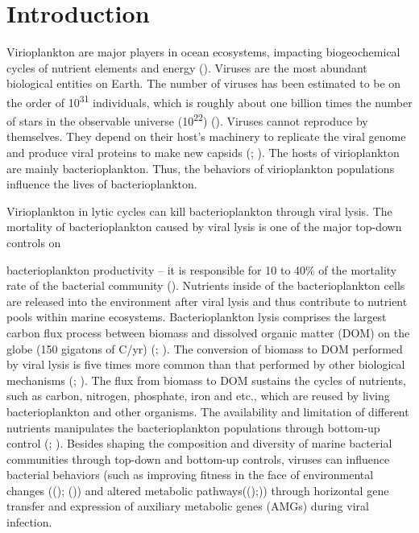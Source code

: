 \documentclass[a4,center,fleqn]{NAR}
\begin{document}
\section{Introduction}

Virioplankton are major players in ocean ecosystems, impacting biogeochemical cycles of nutrient elements and energy (\cite{Suttle2005}). 
Viruses are the most abundant biological entities on Earth. 
The number of viruses has been estimated to be on the order of 10\textsuperscript{31} individuals, which is roughly about one billion times the number of stars in the observable universe (10\textsuperscript{22}) (\cite{Hatfull2006}). 
Viruses cannot reproduce by themselves. They depend on their host’s machinery to replicate the viral genome and produce viral proteins to make new capsids (\cite{Whittaker1998}; \cite{Doms1993}). 
The hosts of virioplankton are mainly bacterioplankton. Thus, the behaviors of virioplankton populations influence the lives of bacterioplankton. 

Virioplankton in lytic cycles can kill bacterioplankton through viral lysis. 
The mortality of bacterioplankton caused by viral lysis is one of the major top-down controls on 

\enlargethispage{-65.1pt}
bacterioplankton productivity – it is responsible for 10 to 40\% of the mortality rate of the bacterial community (\cite{Fuhrman1999}). 
Nutrients inside of the bacterioplankton cells are released into the environment after viral lysis and thus contribute to nutrient pools within marine ecosystems. 
Bacterioplankton lysis comprises the largest carbon flux process between biomass and dissolved organic matter (DOM) on the globe (150 gigatons of C/yr) (\cite{Wilhelm1999}; \cite{Suttle2005}).  
The conversion of biomass to DOM performed by viral lysis is five times more common than that performed by other biological mechanisms (\cite{Wilhelm1999}; \cite{Suttle2005}). 
The flux from biomass to DOM sustains the cycles of nutrients, such as carbon, nitrogen, phosphate, iron and etc., which are reused by living bacterioplankton and other organisms.
 The availability and limitation of different nutrients manipulates the bacterioplankton populations through bottom-up control (\cite{Wilhelm1999}; \cite{Suttle2005}). 
 Besides shaping the composition and diversity of marine bacterial communities through top-down and bottom-up controls, viruses can influence bacterial behaviors (such as improving fitness in the face of  environmental changes ((\cite{Jiang1998}); (\cite{Schwartz:2017aa})) and altered metabolic pathways((\cite{Ochman2000});\cite{Rosenwasser2016})) through horizontal gene transfer and expression of auxiliary metabolic genes (AMGs) during viral infection. 
  
\end{document}
